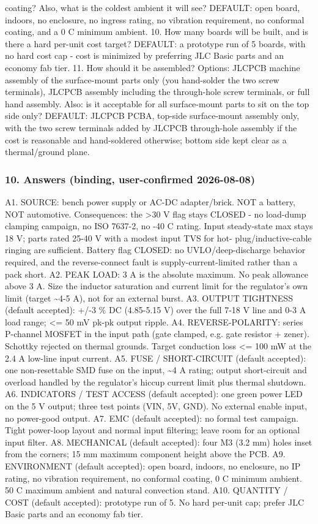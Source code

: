 \documentclass[11pt,a4paper]{article}
\begin{document}
coating? Also, what is the coldest ambient it will see? DEFAULT: open board, indoors, no enclosure, no ingress rating, no vibration requirement, no conformal coating, and a 0 C minimum ambient. 10. How many boards will be built, and is there a hard per-unit cost target? DEFAULT: a prototype run of 5 boards, with no hard cost cap - cost is minimized by preferring JLC Basic parts and an economy fab tier. 11. How should it be assembled? Options: JLCPCB machine assembly of the surface-mount parts only (you hand-solder the two screw terminals), JLCPCB assembly including the through-hole screw terminals, or full hand assembly. Also: is it acceptable for all surface-mount parts to sit on the top side only? DEFAULT: JLCPCB PCBA, top-side surface-mount assembly only, with the two screw terminals added by JLCPCB through-hole assembly if the cost is reasonable and hand-soldered otherwise; bottom side kept clear as a thermal/ground plane.

\subsubsection*{10. Answers (binding, user-confirmed 2026-08-08)}
A1. SOURCE: bench power supply or AC-DC adapter/brick. NOT a battery, NOT automotive. Consequences: the \textgreater{}30 V flag stays CLOSED - no load-dump clamping campaign, no ISO 7637-2, no -40 C rating. Input steady-state max stays 18 V; parts rated 25-40 V with a modest input TVS for hot- plug/inductive-cable ringing are sufficient. Battery flag CLOSED: no UVLO/deep-discharge behavior required, and the reverse-connect fault is supply-current-limited rather than a pack short. A2. PEAK LOAD: 3 A is the absolute maximum. No peak allowance above 3 A. Size the inductor saturation and current limit for the regulator's own limit (target \textasciitilde{}4-5 A), not for an external burst. A3. OUTPUT TIGHTNESS (default accepted): +/-3 \% DC (4.85-5.15 V) over the full 7-18 V line and 0-3 A load range; \textless{}= 50 mV pk-pk output ripple. A4. REVERSE-POLARITY: series P-channel MOSFET in the input path (gate clamped, e.g. gate resistor + zener). Schottky rejected on thermal grounds. Target conduction loss \textless{}= 100 mW at the 2.4 A low-line input current. A5. FUSE / SHORT-CIRCUIT (default accepted): one non-resettable SMD fuse on the input, \textasciitilde{}4 A rating; output short-circuit and overload handled by the regulator's hiccup current limit plus thermal shutdown. A6. INDICATORS / TEST ACCESS (default accepted): one green power LED on the 5 V output; three test points (VIN, 5V, GND). No external enable input, no power-good output. A7. EMC (default accepted): no formal test campaign. Tight power-loop layout and normal input filtering; leave room for an optional input filter. A8. MECHANICAL (default accepted): four M3 (3.2 mm) holes inset from the corners; 15 mm maximum component height above the PCB. A9. ENVIRONMENT (default accepted): open board, indoors, no enclosure, no IP rating, no vibration requirement, no conformal coating, 0 C minimum ambient. 50 C maximum ambient and natural convection stand. A10. QUANTITY / COST (default accepted): prototype run of 5. No hard per-unit cap; prefer JLC Basic parts and an economy fab tier.
\end{document}
